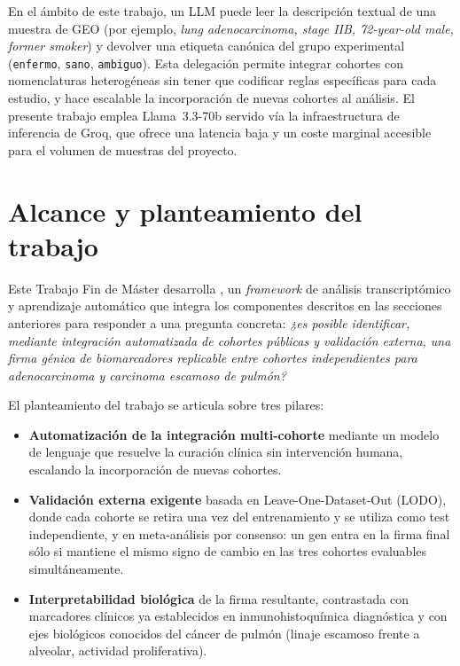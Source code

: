 En el ámbito de este trabajo, un LLM puede leer la descripción textual de
una muestra de GEO (por ejemplo, \emph{lung adenocarcinoma, stage IIB,
72-year-old male, former smoker}) y devolver una etiqueta canónica del
grupo experimental (\texttt{enfermo}, \texttt{sano}, \texttt{ambiguo}). Esta
delegación permite integrar cohortes con nomenclaturas heterogéneas sin
tener que codificar reglas específicas para cada estudio, y hace escalable
la incorporación de nuevas cohortes al análisis. El presente trabajo emplea
Llama~3.3-70b servido vía la infraestructura de inferencia de Groq, que
ofrece una latencia baja y un coste marginal accesible para el volumen de
muestras del proyecto.

\section{Alcance y planteamiento del trabajo}
\label{sec:alcance}

Este Trabajo Fin de Máster desarrolla \framework, un \emph{framework} de
análisis transcriptómico y aprendizaje automático que integra los
componentes descritos en las secciones anteriores para responder a una
pregunta concreta: \emph{¿es posible identificar, mediante integración
automatizada de cohortes públicas y validación externa, una firma génica de
biomarcadores replicable entre cohortes independientes para
adenocarcinoma y carcinoma escamoso de pulmón?}

El planteamiento del trabajo se articula sobre tres pilares:

\begin{itemize}
  \item \textbf{Automatización de la integración multi-cohorte} mediante un
  modelo de lenguaje que resuelve la curación clínica sin intervención
  humana, escalando la incorporación de nuevas cohortes.
  \item \textbf{Validación externa exigente} basada en Leave-One-Dataset-Out
  (LODO), donde cada cohorte se retira una vez del entrenamiento y se
  utiliza como test independiente, y en meta-análisis por consenso: un gen
  entra en la firma final sólo si mantiene el mismo signo de cambio en las
  tres cohortes evaluables simultáneamente.
  \item \textbf{Interpretabilidad biológica} de la firma resultante,
  contrastada con marcadores clínicos ya establecidos en
  inmunohistoquímica diagnóstica y con ejes biológicos conocidos del
  cáncer de pulmón (linaje escamoso frente a alveolar, actividad
  proliferativa).
\end{itemize}

